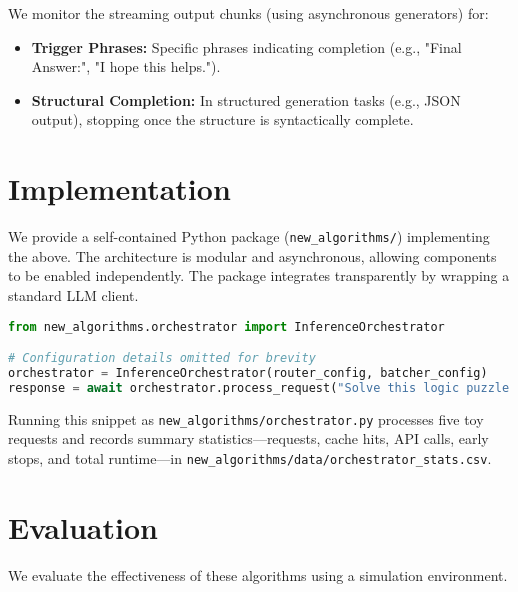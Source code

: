 \documentclass[11pt]{article}
\begin{document}
We monitor the streaming output chunks (using asynchronous generators) for:
\begin{itemize}
    \item \textbf{Trigger Phrases:} Specific phrases indicating completion (e.g., "Final Answer:", "I hope this helps.").
    \item \textbf{Structural Completion:} In structured generation tasks (e.g., JSON output), stopping once the structure is syntactically complete.
\end{itemize}

\section{Implementation}
We provide a self-contained Python package (\texttt{new\_algorithms/}) implementing the above. The architecture is modular and asynchronous, allowing components to be enabled independently. The package integrates transparently by wrapping a standard LLM client.

\begin{lstlisting}[language=Python, caption=Example usage of the integrated orchestrator]
from new_algorithms.orchestrator import InferenceOrchestrator

# Configuration details omitted for brevity
orchestrator = InferenceOrchestrator(router_config, batcher_config)
response = await orchestrator.process_request("Solve this logic puzzle...", params)
\end{lstlisting}

Running this snippet as \texttt{new\_algorithms/orchestrator.py} processes five toy requests and records summary statistics---requests, cache hits, API calls, early stops, and total runtime---in \texttt{new\_algorithms/data/orchestrator\_stats.csv}.

\section{Evaluation}
We evaluate the effectiveness of these algorithms using a simulation environment.
\end{document}
